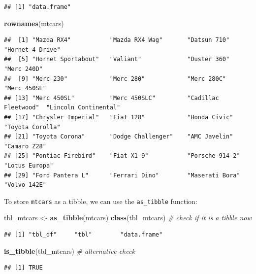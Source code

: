\documentclass[
  12pt,
  oneside]{book}
\newenvironment{Shaded}{\begin{snugshade}}{\end{snugshade}}
\newcommand{\CommentTok}[1]{\textcolor[rgb]{0.56,0.35,0.01}{\textit{#1}}}
\newcommand{\FunctionTok}[1]{\textcolor[rgb]{0.13,0.29,0.53}{\textbf{#1}}}
\newcommand{\NormalTok}[1]{#1}
\newcommand{\OtherTok}[1]{\textcolor[rgb]{0.56,0.35,0.01}{#1}}
\theoremstyle{definition}
\theoremstyle{definition}
\theoremstyle{definition}
\theoremstyle{definition}
\theoremstyle{remark}
\begin{document}
\begin{verbatim}
## [1] "data.frame"
\end{verbatim}

\begin{Shaded}
\begin{Highlighting}[]
\FunctionTok{rownames}\NormalTok{(mtcars) }
\end{Highlighting}
\end{Shaded}

\begin{verbatim}
##  [1] "Mazda RX4"           "Mazda RX4 Wag"       "Datsun 710"          "Hornet 4 Drive"     
##  [5] "Hornet Sportabout"   "Valiant"             "Duster 360"          "Merc 240D"          
##  [9] "Merc 230"            "Merc 280"            "Merc 280C"           "Merc 450SE"         
## [13] "Merc 450SL"          "Merc 450SLC"         "Cadillac Fleetwood"  "Lincoln Continental"
## [17] "Chrysler Imperial"   "Fiat 128"            "Honda Civic"         "Toyota Corolla"     
## [21] "Toyota Corona"       "Dodge Challenger"    "AMC Javelin"         "Camaro Z28"         
## [25] "Pontiac Firebird"    "Fiat X1-9"           "Porsche 914-2"       "Lotus Europa"       
## [29] "Ford Pantera L"      "Ferrari Dino"        "Maserati Bora"       "Volvo 142E"
\end{verbatim}

To store \texttt{mtcars} as a tibble, we can use the \texttt{as\_tibble} function:

\begin{Shaded}
\begin{Highlighting}[]
\NormalTok{tbl\_mtcars }\OtherTok{\textless{}{-}} \FunctionTok{as\_tibble}\NormalTok{(mtcars)}
\FunctionTok{class}\NormalTok{(tbl\_mtcars) }\CommentTok{\# check if it is a tibble now}
\end{Highlighting}
\end{Shaded}

\begin{verbatim}
## [1] "tbl_df"     "tbl"        "data.frame"
\end{verbatim}

\begin{Shaded}
\begin{Highlighting}[]
\FunctionTok{is\_tibble}\NormalTok{(tbl\_mtcars) }\CommentTok{\# alternative check}
\end{Highlighting}
\end{Shaded}

\begin{verbatim}
## [1] TRUE
\end{verbatim}
\end{document}
